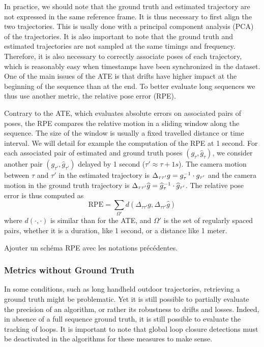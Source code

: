 In practice, we should note that the ground truth and estimated trajectory
are not expressed in the same reference frame.
It is thus necessary to first align the two trajectories.
This is usally done with a principal component analysis (PCA)
of the trajectories.
It is also important to note that the ground truth and estimated trajectories
are not sampled at the same timings and frequency.
Therefore, it is also necessary to correctly associate poses of each trajectory,
which is reasonably easy when timestamps have been synchronized in the dataset.
One of the main issues of the ATE is that drifts have higher impact at the beginning
of the sequence than at the end.
To better evaluate long sequences we thus use another metric,
the relative pose error (RPE).

Contrary to the ATE, which evaluates absolute errors on associated pairs of poses,
the RPE compares the relative motion in a sliding window along the sequence.
The size of the window is usually a fixed travelled distance or time interval.
We will detail for example the computation of the RPE at 1 second.
For each associated pair of estimated and ground truth poses $(g_{\tau}, \widehat{g}_{\tau})$,
we consider another pair $(g_{\tau'}, \widehat{g}_{\tau'})$
delayed by 1 second ($\tau' \approx \tau + 1s$).
The camera motion between $\tau$ and $\tau'$ in the estimated trajectory is
$\Delta_{\tau \tau'} g = g_{\tau}^{-1} \cdot g_{\tau'}$
and the camera motion in the ground truth trajectory is
$\Delta_{\tau \tau'} \widehat{g} = \widehat{g}_{\tau}^{-1} \cdot \widehat{g}_{\tau'}$.
The relative pose error is thus computed as
\[
	\text{RPE} = \sum_{\Omega'} d(\Delta_{\tau \tau'} g, \Delta_{\tau \tau'} \widehat{g})
\]
where $d(\cdot, \cdot)$ is similar than for the ATE,
and $\Omega'$ is the set of regularly spaced pairs,
whether it is a duration, like 1 second, or a distance like 1 meter.

\alert{Ajouter un schéma RPE avec les notations précédentes.}


\subsubsection{Metrics without Ground Truth}%
\label{ssub:metrics_no_gt}

In some conditions, such as long handheld outdoor trajectories,
retrieving a ground truth might be problematic.
Yet it is still possible to partially evaluate the precision of an algorithm,
or rather its robustness to drifts and losses.
Indeed, in absence of a full sequence ground truth,
it is still possible to evaluate the tracking of loops.
It is important to note that global loop closure detections must
be deactivated in the algorithms for these measures to make sense.

